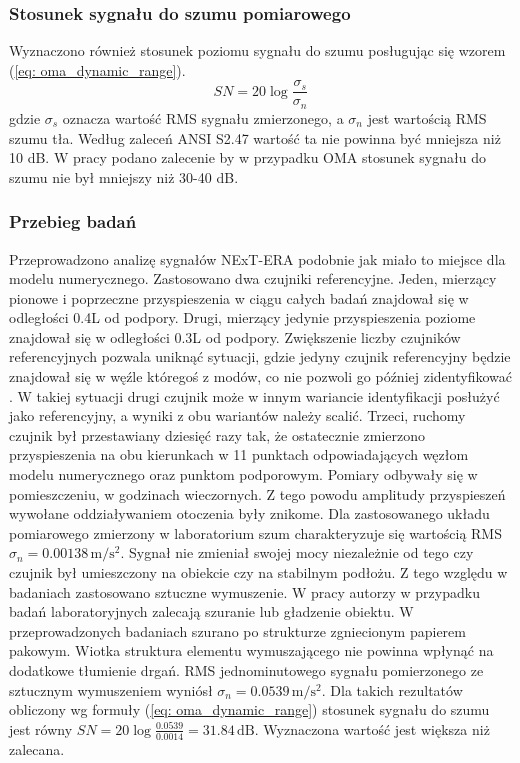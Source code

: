 \subsubsection{Stosunek sygnału do szumu pomiarowego}
Wyznaczono również stosunek poziomu sygnału do szumu posługując się wzorem (\ref{eq: oma_dynamic_range}).
\begin{equation} \label{eq: oma_dynamic_range}
	SN = 20 \log{\frac{\sigma_s}{\sigma_n}}
\end{equation}
gdzie $\sigma_s$ oznacza wartość RMS sygnału zmierzonego, a $\sigma_n$ jest wartością RMS szumu tła. Według zaleceń ANSI S2.47 wartość ta nie powinna być mniejsza niż 10 dB. W pracy \cite{Brincker2015} podano zalecenie by w przypadku OMA stosunek sygnału do szumu nie był mniejszy niż 30-40 dB. 

\subsubsection{Przebieg badań}
Przeprowadzono analizę sygnałów NExT-ERA podobnie jak miało to miejsce dla modelu numerycznego. Zastosowano dwa czujniki referencyjne. Jeden, mierzący pionowe i poprzeczne przyspieszenia w ciągu całych badań znajdował się w odległości 0.4L od podpory. Drugi, mierzący jedynie przyspieszenia poziome znajdował się w odległości 0.3L od podpory. Zwiększenie liczby czujników referencyjnych pozwala uniknąć sytuacji, gdzie jedyny czujnik referencyjny będzie znajdował się w węźle któregoś z modów, co nie pozwoli go później zidentyfikować \parencite{Caicedo2011}. W takiej sytuacji drugi czujnik może w innym wariancie identyfikacji posłużyć jako referencyjny, a wyniki z obu wariantów należy scalić. Trzeci, ruchomy czujnik był przestawiany dziesięć razy tak, że ostatecznie zmierzono przyspieszenia na obu kierunkach w 11 punktach odpowiadających węzłom modelu numerycznego oraz punktom podporowym. 
Pomiary odbywały się w pomieszczeniu, w godzinach wieczornych. Z tego powodu amplitudy przyspieszeń wywołane oddziaływaniem otoczenia były znikome. Dla zastosowanego układu pomiarowego zmierzony w laboratorium szum charakteryzuje się wartością RMS $\sigma_n=0.00138\,  \text{m}/\text{s}^2$. Sygnał nie zmieniał swojej mocy niezależnie od tego czy czujnik był umieszczony na obiekcie czy na stabilnym podłożu. Z tego względu w badaniach zastosowano sztuczne wymuszenie. W pracy \cite{Brincker2015} autorzy w przypadku badań laboratoryjnych zalecają szuranie lub gładzenie obiektu. W przeprowadzonych badaniach szurano po strukturze zgniecionym papierem pakowym. Wiotka struktura elementu wymuszającego nie powinna wpłynąć na dodatkowe tłumienie drgań. RMS jednominutowego sygnału pomierzonego ze sztucznym wymuszeniem wyniósł $\sigma_n=0.0539\,  \text{m}/\text{s}^2$. Dla takich rezultatów obliczony wg formuły (\ref{eq: oma_dynamic_range}) stosunek sygnału do szumu jest równy $SN = 20\log{\frac{0.0539}{0.0014}}=31.84\,\text{dB}$. Wyznaczona wartość jest większa niż zalecana.

